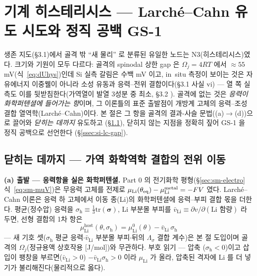 \section{기계 히스테리시스 --- Larché--Cahn 유도 시도와 정직 공백 GS-1}\label{sec:si-mech}
생존 지도(§3.1)에서 골격 밖 ``새 물리'' 로 분류된 유일한 노드는 N3(히스테리시스)였다. 크기와 기원이
모두 다르다: 골격의 spinodal 상한 gap 은 $\Omega_j{=}4RT$ 에서 $\approx55$ mV(식~\eqref{eq:dUhys})인데
Si 실측 갈림은 수백 mV 이고\cite{obrovac_chevrier2014}, in~situ 측정이 보이는 것은 자유에너지
이중웰이 아니라 소성 유동과 응력--전위 결합이다(§3.1 사실 vi) --- 열 쪽 실측도 이를 뒷받침한다(가역열이
발열 3성분 중 최소, §3.2 \cite{arnot_calorimetry2021}). 골격에 없는 것은 \emph{응력이 화학퍼텐셜에 들어가는
항}이며, 그 이론틀의 표준 출발점이 개방계 고체의 응력--조성 결합 열역학(Larché--Cahn)이다\cite{larchecahn1973}.
본 절은 그 항을 골격의 결과-사슬 문법((a)$\to$(d))으로 끌어와 \emph{닫히는 데까지} 유도하고
(\S\ref{ssec:si-lc-derive}), 닫히지 않는 지점을 정확히 짚어 GS-1 을 정직 공백으로 선언한다
(\S\ref{ssec:si-lc-gap}).

\subsection{닫히는 데까지 --- 가역 화학역학 결합의 전위 이동}\label{ssec:si-lc-derive}
\textbf{(a) 출발 --- 응력항을 실은 화학퍼텐셜.} Part 0 의 전기화학 평형(\S\ref{sec:sm-electro}
식~\eqref{eq:sm-muV})은 무응력 고체를 전제로 $\mu_\mathrm{Li}(\theta_{\mathrm{eq}})-\mu_\mathrm{Li}^\mathrm{metal}
=-FV$ 였다. Larché--Cahn 이론은 응력 하 고체에서 이동 종(Li)의 화학퍼텐셜에 응력--부피 결합 몫을
더한다\cite{larchecahn1973}. 평균(정수압) 응력을 $\sigma_\mathrm{h}\equiv\tfrac13\mathrm{tr}(\bm\sigma)$,
Li 부분몰 부피를 $\bar v_\mathrm{Li}\equiv\partial v/\partial(\text{Li 함량})$ 라 두면, 선형
결합의 1차 항은
\begin{equation}
\mu_\mathrm{Li}^\mathrm{host}(\theta,\sigma_\mathrm{h})
=\mu_\mathrm{Li}^{0}(\theta)-\bar v_\mathrm{Li}\,\sigma_\mathrm{h}
\label{eq:si-lcmu}
\end{equation}
--- 새 기호 셋($\sigma_\mathrm{h}$ 평균 응력$\cdot$$\bar v_\mathrm{Li}$ 부분몰 부피$\cdot$뒤의 $\Lambda_\sigma$
결합 계수)은 본 절 도입이며 골격의 $\Omega_j$(정규용액 상호작용 [J/mol])와 무관하다. 부호 읽기 --- 압축
($\sigma_\mathrm{h}<0$)이고 삽입이 팽창을 부르면($\bar v_\mathrm{Li}>0$) $-\bar v_\mathrm{Li}\sigma_\mathrm{h}>0$
이라 $\mu_\mathrm{Li}$ 가 올라, 압축된 격자에 Li 를 더 넣기가 불리해진다(물리적으로 옳다).

